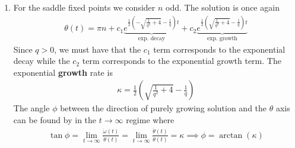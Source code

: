 \documentclass{article}
\theoremstyle{definition}
\newcommand{\f}[2]{\frac{#1}{#2}}
\begin{document}
\begin{enumerate}[label=(\alph*)]
	
	\begin{figure}[!htb]
		\centering
	\end{figure}

	Mathematica code:
	\begin{lstlisting}
	(*underdamped*)
	
	StreamPlot[{y, -1/(1/1)*y - (x - 0 Pi)}, {x, -1, 1}, {y, -1, 1}, 
	FrameLabel -> {"\[Theta]", "w"}]
	
	(*Overdamped*)
	
	StreamPlot[{y, -1/(1/4)*y - (x - 0 Pi)}, {x, -1, 1}, {y, -1, 1}, 
	FrameLabel -> {"\[Theta]", "w"}]
	\end{lstlisting}
	
	
	
	\item For the saddle fixed points we consider $n$ odd. The solution is once again
	\begin{align*}
	\theta(t) = \pi  n+
	c_1 \underbrace{e^{\frac{1}{2}
		\left(-\sqrt{\frac{1}{q^2}+4}-\frac{1}{q}\right) t}}_{\text{exp. decay}}
	+c_2
	\underbrace{e^{\frac{1}{2} \left(\sqrt{\frac{1}{q^2}+4}-\frac{1}{q}\right) t}}_{\text{exp. growth}}
	\end{align*}
	Since $q>0$, we must have that the $c_1$ term corresponds to the exponential decay while the $c_2$ term corresponds to the exponential growth term. The exponential \textbf{growth} rate is 
	\begin{align*}
	\boxed{\kappa = \frac{1}{2} \left(\sqrt{\frac{1}{q^2}+4}-\frac{1}{q}\right)}
	\end{align*}
	The angle $\phi$ between the direction of purely growing solution and the $\theta$ axis can be found by in the $t\to \infty$ regime where
	\begin{align*}
	\tan\phi = \lim_{t\to \infty} \f{\dot \omega(t)}{\dot \theta(t)} = \lim_{t\to \infty} \f{\ddot \theta(t)}{\dot \theta(t)} = \kappa \implies \boxed{\phi = \arctan(\kappa)}
	\end{align*}


\end{enumerate}
\end{document}

